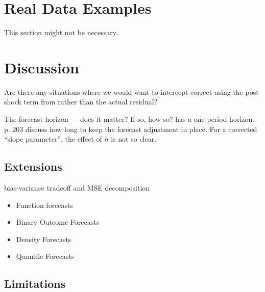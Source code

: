 \documentclass[11pt]{article}
\theoremstyle{definition}
\begin{document}
\section{Real Data Examples}
This section might not be necessary.
\section{Discussion}

Are there any situations where we would want to intercept-correct using the post-shock term from \cite{lin2021minimizing} rather than the actual residual?

The forecast horizon --- does it matter?  If so, how so?  \cite{lin2021minimizing} has a one-period horizon.  \cite{clements1998forecasting}{p. 203} discuss how long to keep the forecast adjustment in place.  For a corrected ``slope parameter'', the effect of $h$ is not so clear.\\

\subsection{Extensions}\label{Extensions}
bias-variance tradeoff and MSE decomposition\\

\begin{itemize}
  \item Function forecasts
  \item Binary Outcome Forecasts
  \item Density Forecasts
  \item Quantile Forecasts
\end{itemize}

\subsection{Limitations}\label{Limitations}



\clearpage



 
\end{document}
